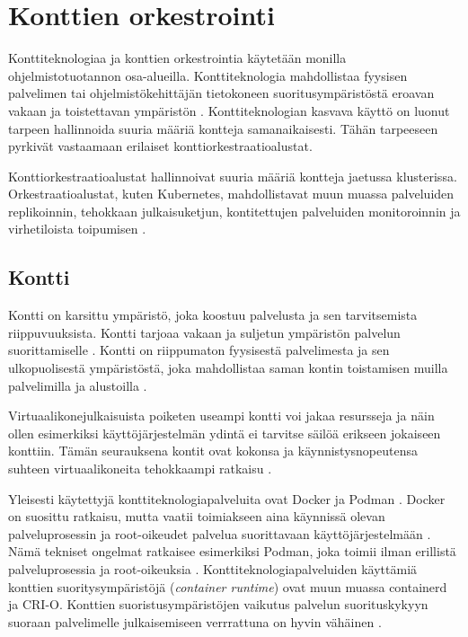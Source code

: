 \chapter{Konttien orkestrointi\label{orchestration}}

Konttiteknologiaa ja konttien orkestrointia käytetään monilla ohjelmistotuotannon osa-alueilla.
Konttiteknologia mahdollistaa fyysisen palvelimen tai ohjelmistökehittäjän tietokoneen suoritusympäristöstä eroavan vakaan ja toistettavan ympäristön \cite{Watada19}.
Konttiteknologian kasvava käyttö on luonut tarpeen hallinnoida suuria määriä kontteja samanaikaisesti.
Tähän tarpeeseen pyrkivät vastaamaan erilaiset konttiorkestraatioalustat.

Konttiorkestraatioalustat hallinnoivat suuria määriä kontteja jaetussa klusterissa.
Orkestraatioalustat, kuten Kubernetes, mahdollistavat muun muassa palveluiden replikoinnin, tehokkaan julkaisuketjun, kontitettujen palveluiden monitoroinnin ja virhetiloista toipumisen \cite{Khan17}.

\section{Kontti\label{container}}


Kontti on karsittu ympäristö, joka koostuu palvelusta ja sen tarvitsemista riippuvuuksista.
Kontti tarjoaa vakaan ja suljetun ympäristön palvelun suorittamiselle \cite{Watada19}.
Kontti on riippumaton fyysisestä palvelimesta ja sen ulkopuolisestä ympäristöstä, joka mahdollistaa saman kontin toistamisen muilla palvelimilla ja alustoilla \cite{Saha18}.

Virtuaalikonejulkaisuista poiketen useampi kontti voi jakaa resursseja ja näin ollen esimerkiksi käyttöjärjestelmän ydintä ei tarvitse säilöä erikseen jokaiseen konttiin.
Tämän seurauksena kontit ovat kokonsa ja käynnistysnopeutensa suhteen virtuaalikoneita tehokkaampi ratkaisu \cite{Dua14}.


Yleisesti käytettyjä konttiteknologiapalveluita ovat Docker ja Podman \cite{Abraham20, Bernstein14}.
Docker on suosittu ratkaisu, mutta vaatii toimiakseen aina käynnissä olevan palveluprosessin ja root-oikeudet palvelua suorittavaan käyttöjärjestelmään \cite{Abraham20}.
Nämä tekniset ongelmat ratkaisee esimerkiksi Podman, joka toimii ilman erillistä palveluprosessia ja root-oikeuksia \cite{Gantikow20}.
Konttiteknologiapalveluiden käyttämiä konttien suoritysympäristöjä (\textit{container runtime}) ovat muun muassa containerd ja CRI-O.
Konttien suoristusympäristöjen vaikutus palvelun suorituskykyyn suoraan palvelimelle julkaisemiseen verrrattuna on hyvin vähäinen \cite{torrez19, espe20}.

